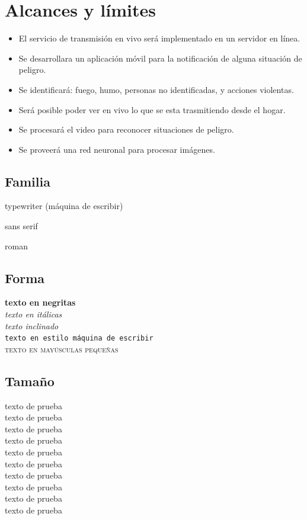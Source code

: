 \section{Alcances y límites}
\begin{itemize}
    \item El servicio de transmisión en vivo será implementado en un servidor en línea.
    \item Se desarrollara un aplicación móvil para la notificación de alguna situación de peligro.
    \item Se identificará: fuego, humo, personas no identificadas, y acciones violentas.
    \item Será posible poder ver en vivo lo que se esta trasmitiendo desde el hogar.
    \item Se procesará el video para reconocer situaciones de peligro.
    \item Se proveerá una red neuronal para procesar imágenes.
\end{itemize}

\subsection{Familia}
{\ttfamily typewriter (máquina de escribir)}

{\sffamily sans serif}

{\rmfamily roman}

\subsection{Forma}
\textbf{texto en negritas}\\
\textit{texto en itálicas}\\
\textsl{texto inclinado}\\
\texttt{texto en estilo máquina de escribir}\\
\textsc{texto en mayúsculas pequeñas}

\subsection{Tamaño}
{\tiny texto de prueba}\\
{\scriptsize texto de prueba}\\
{\footnotesize texto de prueba}\\
{\small texto de prueba}\\
{\normalsize texto de prueba}\\
{\large texto de prueba}\\
{\Large texto de prueba}\\
{\LARGE texto de prueba}\\
{\huge texto de prueba}\\
{\Huge texto de prueba}

